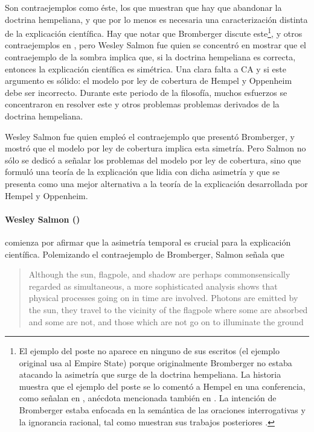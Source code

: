 Son contraejemplos como éste, los que muestran que hay que
abandonar la doctrina hempeliana, y que por lo menos es
necesaria una caracterización distinta de la explicación
científica. Hay que notar que Bromberger discute
este\footnote{ 
  El ejemplo del poste no aparece en ninguno de sus escritos
  (el ejemplo original usa al Empire State) porque
  originalmente Bromberger no estaba atacando la asimetría
  que surge de la doctrina hempeliana. La historia muestra
  que el ejemplo del poste se lo comentó a Hempel en una
  conferencia, como señalan en \parencite{mitBromberger},
  anécdota mencionada también en
  \parencite[p.~81]{Dewulf2022}. La intención de Bromberger
  estaba enfocada en la semántica de las oraciones
  interrogativas y la ignorancia racional, tal como muestran
  sus trabajos posteriores \parencite{Bromberger1992}.
},
y otros contraejemplos en \citeyear{Bromberger1966}, pero
Wesley Salmon fue quien se concentró en mostrar que el
contraejemplo de la sombra implica que, si la doctrina
hempeliana es correcta, entonces la explicación científica
es simétrica. Una clara falta a CA y si este argumento es
sólido: el modelo por ley de cobertura de Hempel y Oppenheim
debe ser incorrecto. Durante este periodo de la filosofía,
muchos esfuerzos se concentraron en resolver este y otros
problemas problemas derivados de la doctrina hempeliana.

Wesley Salmon fue quien empleó el contraejemplo que presentó
Bromberger, y mostró que el modelo por ley de cobertura
implica esta simetría. Pero Salmon no sólo se dedicó a
señalar los problemas del modelo por ley de cobertura, sino
que formuló una teoría de la explicación que lidia con dicha
asimetría y que se presenta como una mejor alternativa a la
teoría de la explicación desarrollada por Hempel y 
Oppenheim.

\paragraph{Wesley Salmon (\citeyear{Salmon1970})} comienza
por afirmar que la asimetría temporal es crucial para la
explicación científica. Polemizando el contraejemplo de
Bromberger, Salmon señala que

 \begin{quote} 
    Although the sun, flagpole, and shadow are perhaps
    commonsensically regarded as simultaneous, a more
    sophisticated analysis shows that physical processes
    going on in time are involved.	Photons are emitted by
    the sun, they travel to the	vicinity of the flagpole
    where some are absorbed and some are not, and those
    which are not go on to illuminate the ground
    \parencite[p.~72]{Salmon1970}
 \end{quote}

